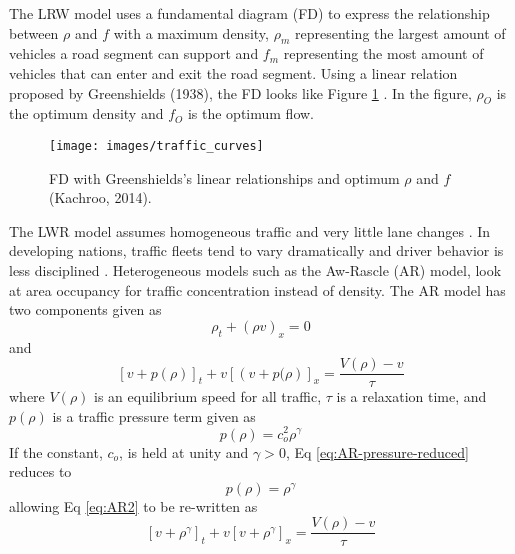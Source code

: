 The LRW model uses a fundamental diagram (FD) to express the relationship between $\rho$ and  $f$ with a maximum density, $\rho_{m}$ representing the largest amount of vehicles a road segment can support and $f_{m}$ representing the most amount of vehicles that can enter and exit the road segment. Using a linear relation proposed by Greenshields (1938), the FD looks like Figure \ref{fig:LRW-FD} \cite{Greenshields1935}. In the figure, $\rho_{O}$ is the optimum density and $f_{O}$ is the optimum flow.
%
\begin{figure}[!htbp]
\centering
\texttt{[image: images/traffic\_curves]}  %
\caption[Fundamental diagram with Greenshields's linear relationships and optimum $\rho$ and $f$]{FD with Greenshields's linear relationships and optimum $\rho$ and $f$ (Kachroo, 2014).}
\label{fig:LRW-FD}
\end{figure}
%
The LWR model assumes homogeneous traffic and very little lane changes \cite{Kachroo2014}. In developing nations, traffic fleets tend to vary dramatically and driver behavior is less disciplined \cite{Mohan2013}. Heterogeneous models such as the Aw-Rascle (AR) model, look at area occupancy for traffic concentration instead of density. The AR model has two components given as 
\begin{equation}
\label{eq:AR1}
\rho_{t}+\left (\rho v  \right )_{x}=0
\end{equation}	
%
and 
%
\begin{equation}
\label{eq:AR2}
\left [ v+p(\rho) \right ]_{t}+v\left [ \left ( v+p(\rho \right ) \right ]_{x}=\frac{V(\rho)-v}{\tau}
\end{equation}	
%
where $V(\rho)$ is an equilibrium speed for all traffic, $\tau$ is a relaxation time, and $p(\rho)$ is a traffic pressure term given as
%
\begin{equation}
\label{eq:AR-pressure}
p(\rho)=c_{o}^{2}\rho^{\gamma}
\end{equation}	
%
If the constant, $c_{o}$, is held at unity and $\gamma >0$, Eq \ref{eq:AR-pressure-reduced} reduces to 
%
\begin{equation}
\label{eq:AR-pressure-reduced}
p(\rho)=\rho^{\gamma}
\end{equation}	
%
allowing Eq \ref{eq:AR2} to be re-written as
%
\begin{equation}
\label{eq:AR2-reduced}
\left [ v+\rho^{\gamma} \right ]_{t}+v\left [v+\rho^{\gamma}\right ]_{x}=\frac{V(\rho)-v}{\tau}
\end{equation}	
%
